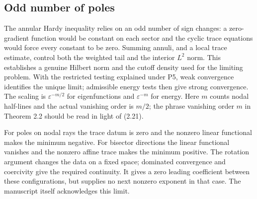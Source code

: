 \documentclass[10pt]{article}
\begin{document}
\subsection*{Odd number of poles}
The annular Hardy inequality relies on an odd number of sign changes: a zero-gradient function would be constant on each sector and the cyclic trace equations would force every constant to be zero. Summing annuli, and a local trace estimate, control both the weighted tail and the interior \(L^2\) norm. This establishes a genuine Hilbert norm and the cutoff density used for the limiting problem. With the restricted testing explained under P5, weak convergence identifies the unique limit; admissible energy tests then give strong convergence. The scaling is \(\varepsilon^{-m/2}\) for eigenfunctions and \(\varepsilon^{-m}\) for energy. Here \(m\) counts nodal half-lines and the actual vanishing order is \(m/2\); the phrase vanishing order \(m\) in Theorem 2.2 should be read in light of (2.21).\par
For poles on nodal rays the trace datum is zero and the nonzero linear functional makes the minimum negative. For bisector directions the linear functional vanishes and the nonzero affine trace makes the minimum positive. The rotation argument changes the data on a fixed space; dominated convergence and coercivity give the required continuity. It gives a zero leading coefficient between these configurations, but supplies no next nonzero exponent in that case. The manuscript itself acknowledges this limit.\par
\end{document}
